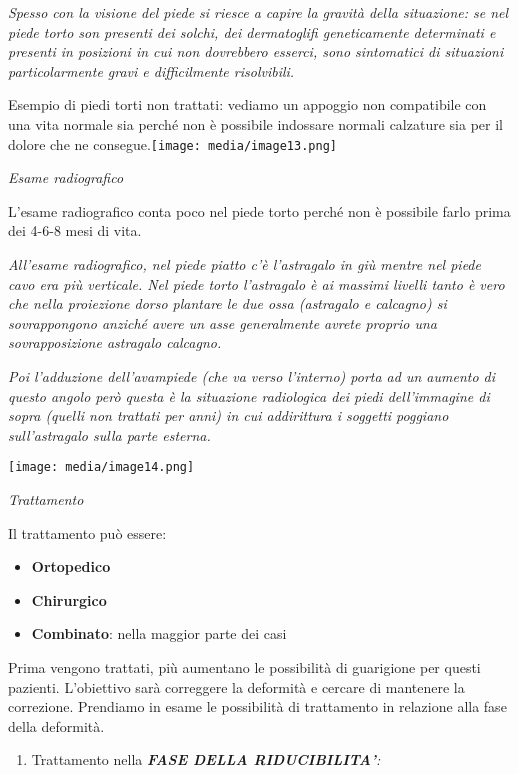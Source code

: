 \documentclass[]{article}
\begin{document}
\emph{Spesso con la visione del piede si riesce a capire la gravità
della situazione: se nel piede torto son presenti dei solchi, dei
dermatoglifi geneticamente determinati e presenti in posizioni in cui
non dovrebbero esserci, sono sintomatici di situazioni particolarmente
gravi e difficilmente risolvibili.}

Esempio di piedi torti non trattati: vediamo un appoggio non compatibile
con una vita normale sia perché non è possibile indossare normali
calzature sia per il dolore che ne
consegue.\texttt{[image: media/image13.png]}

\emph{Esame radiografico}

L'esame radiografico conta poco nel piede torto perché non è possibile
farlo prima dei 4-6-8 mesi di vita.

\emph{All'esame radiografico, nel piede piatto c'è l'astragalo in giù
mentre nel piede cavo era più verticale. Nel piede torto l'astragalo è
ai massimi livelli tanto è vero che nella proiezione dorso plantare le
due ossa (astragalo e calcagno) si sovrappongono anziché avere un asse
generalmente avrete proprio una sovrapposizione astragalo calcagno. }

\emph{Poi l'adduzione dell'avampiede (che va verso l'interno) porta ad
un aumento di questo angolo però questa è la situazione radiologica dei
piedi dell'immagine di sopra (quelli non trattati per anni) in cui
addirittura i soggetti poggiano sull'astragalo sulla parte esterna.}

\texttt{[image: media/image14.png]}

\emph{Trattamento}

Il trattamento può essere:

\begin{itemize}
\item
  \textbf{Ortopedico}
\item
  \textbf{Chirurgico}
\item
  \textbf{Combinato}: nella maggior parte dei casi
\end{itemize}

Prima vengono trattati, più aumentano le possibilità di guarigione per
questi pazienti. L'obiettivo sarà correggere la deformità e cercare di
mantenere la correzione. Prendiamo in esame le possibilità di
trattamento in relazione alla fase della deformità.

\begin{enumerate}
\def\labelenumi{\arabic{enumi}.}
\item
  Trattamento nella \emph{\textbf{FASE DELLA RIDUCIBILITA'}:}
\end{enumerate}
\end{document}
